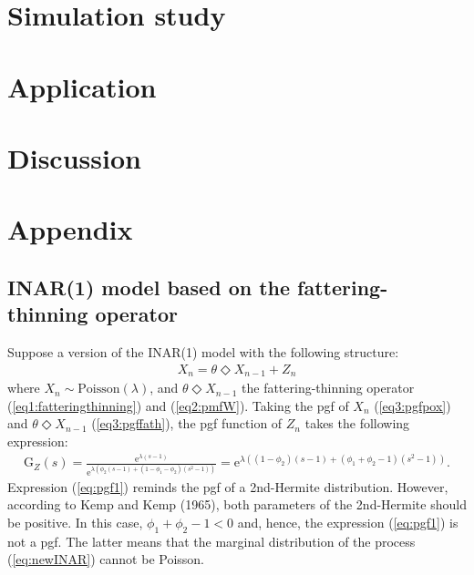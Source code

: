 \documentclass[11pt,a4paper]{article}
\begin{document}
\section{Simulation study}
\section{Application}
\section{Discussion}

\section*{Appendix}
\appendix
\subsection*{INAR(1) model based on the fattering-thinning operator}

Suppose a version of the INAR(1) model with the following structure: 
\begin{align}\label{eq:newINAR}
X_n=\theta \Diamond X_{n-1}+Z_n
\end{align}
where $X_n \sim \textrm{Poisson}(\lambda)$, and $\theta \Diamond X_{n-1}$ the fattering-thinning operator (\ref{eq1:fatteringthinning}) and (\ref{eq2:pmfW}). Taking the pgf of $X_n$ (\ref{eq3:pgfpox}) and $\theta \Diamond X_{n-1}$ (\ref{eq3:pgffath}), the pgf function of $Z_n$ takes the following expression:
\begin{align}\label{eq:pgf1}
\textrm{G}_Z(s)=\frac{\textrm{e}^{\lambda(s-1)}}{\textrm{e}^{\lambda\left(\phi_2(s-1)+(1-\phi_1-\phi_2)(s^2-1)\right)}}=\textrm{e}^{\lambda\left((1-\phi_2)(s-1)+(\phi_1+\phi_2-1)(s^2-1)\right)}.
\end{align}
Expression (\ref{eq:pgf1}) reminds the pgf of a 2nd-Hermite distribution. However, according to Kemp and Kemp (1965), both parameters of the 2nd-Hermite should be positive. In this case, $\phi_1+\phi_2-1<0$ and, hence, the expression (\ref{eq:pgf1}) is not a pgf. The latter means that the marginal distribution of the process (\ref{eq:newINAR}) cannot be Poisson. 

\medskip
\end{document}
